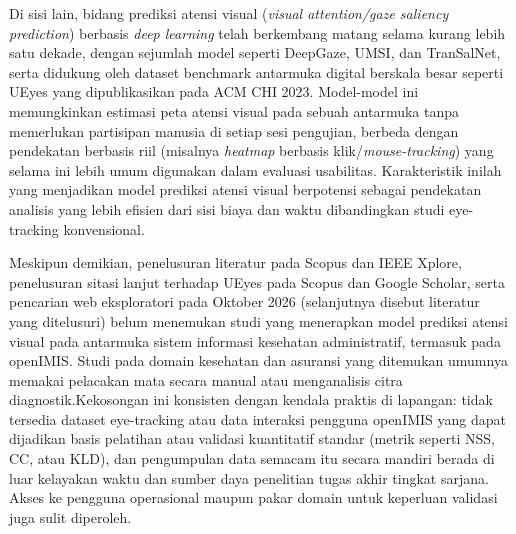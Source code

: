 Di sisi lain, bidang prediksi atensi visual (\textit{visual attention/gaze saliency prediction}) berbasis \textit{deep learning} telah berkembang matang selama kurang lebih satu dekade, dengan sejumlah model seperti DeepGaze, UMSI, dan TranSalNet, serta didukung oleh dataset benchmark antarmuka digital berskala besar seperti UEyes yang dipublikasikan pada ACM CHI 2023. Model-model ini memungkinkan estimasi peta atensi visual pada sebuah antarmuka tanpa memerlukan partisipan manusia di setiap sesi pengujian, berbeda dengan pendekatan berbasis riil (misalnya \textit{heatmap} berbasis klik/\textit{mouse-tracking}) yang selama ini lebih umum digunakan dalam evaluasi usabilitas. Karakteristik inilah yang menjadikan model prediksi atensi visual berpotensi sebagai pendekatan analisis yang lebih efisien dari sisi biaya dan waktu dibandingkan studi eye-tracking konvensional.

Meskipun demikian, penelusuran literatur pada Scopus dan IEEE Xplore, penelusuran sitasi lanjut terhadap UEyes pada Scopus dan Google Scholar, serta pencarian web eksploratori pada Oktober 2026 (selanjutnya disebut literatur yang ditelusuri) belum menemukan studi yang menerapkan model prediksi atensi visual pada antarmuka sistem informasi kesehatan administratif, termasuk pada openIMIS. Studi pada domain kesehatan dan asuransi yang ditemukan umumnya memakai pelacakan mata secara manual atau menganalisis citra diagnostik.Kekosongan ini konsisten dengan kendala praktis di lapangan: tidak tersedia dataset eye-tracking atau data interaksi pengguna openIMIS yang dapat dijadikan basis pelatihan atau validasi kuantitatif standar (metrik seperti NSS, CC, atau KLD), dan pengumpulan data semacam itu secara mandiri berada di luar kelayakan waktu dan sumber daya penelitian tugas akhir tingkat sarjana. Akses ke pengguna operasional maupun pakar domain untuk keperluan validasi juga sulit diperoleh.

